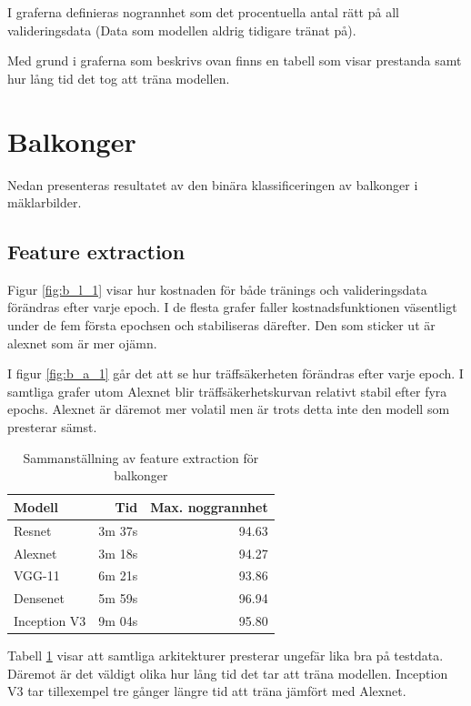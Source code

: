 \documentclass[]{kththesis}
\begin{document}
I graferna definieras nogrannhet som det procentuella antal rätt på all valideringsdata (Data som modellen aldrig tidigare tränat på). 

Med grund i graferna som beskrivs ovan finns en tabell som visar prestanda samt hur lång tid det tog att träna modellen.

\section{Balkonger}
Nedan presenteras resultatet av den binära klassificeringen av balkonger i mäklarbilder.


\subsection{Feature extraction}
Figur \ref{fig:b_l_1} visar hur kostnaden för både tränings och valideringsdata förändras efter varje epoch. 
I de flesta grafer faller kostnadsfunktionen väsentligt under de fem första epochsen och stabiliseras därefter.
Den som sticker ut är alexnet som är mer ojämn.


I figur \ref{fig:b_a_1} går det att se hur träffsäkerheten förändras efter varje epoch.
I samtliga grafer utom Alexnet blir träffsäkerhetskurvan relativt stabil efter fyra epochs.
Alexnet är däremot mer volatil men är trots detta inte den modell som presterar sämst.



\begin{table}[h]
  \centering
  \begin{tabular}{|l|r|r|}
    Modell & Tid & Max. noggrannhet \\ 
    \hline
    Resnet       & 3m 37s & 94.63 \\
    Alexnet      & 3m 18s & 94.27 \\
    VGG-11       & 6m 21s & 93.86 \\
    Densenet     & 5m 59s & 96.94 \\
    Inception V3 & 9m 04s & 95.80 \\
  \end{tabular}
  \caption{Sammanställning av feature extraction för balkonger}
  \label{fig:sam_1}
  
\end{table}

Tabell \ref{fig:sam_1} visar att samtliga arkitekturer presterar ungefär lika bra på testdata.
Däremot är det väldigt olika hur lång tid det tar att träna modellen. 
Inception V3 tar tillexempel tre gånger längre tid att träna jämfört med Alexnet.
\end{document}

